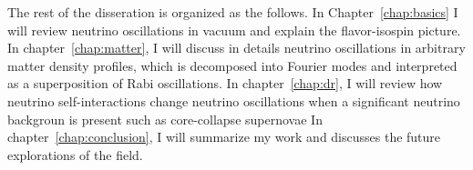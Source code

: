 The rest of the disseration is organized as the follows.
In Chapter~\ref{chap:basics} I will review neutrino oscillations in vacuum and explain the flavor-isospin picture.
In chapter~\ref{chap:matter}, I will discuss in details neutrino oscillations in arbitrary matter density profiles, which is decomposed into Fourier modes and interpreted as a superposition of Rabi oscillations.
In chapter~\ref{chap:dr}, I will review how neutrino self-interactions change neutrino oscillations when a significant neutrino backgroun is present such as core-collapse supernovae
In chapter~\ref{chap:conclusion}, I will summarize my work and discusses the future explorations of the field.
